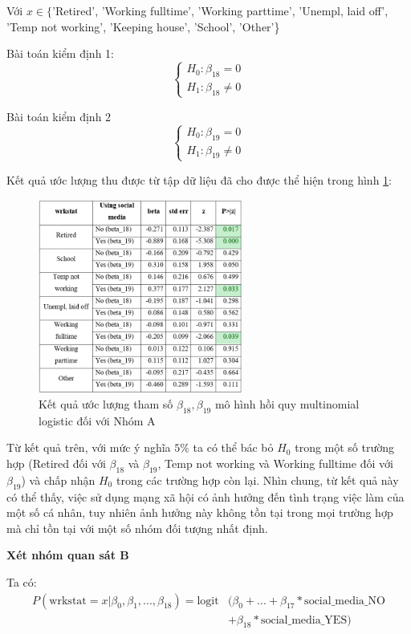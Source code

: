Với $x \in\{$'Retired', 'Working fulltime', 'Working parttime', 'Unempl, laid off', 'Temp not working', 'Keeping house', 'School', 'Other'\}

Bài toán kiểm định 1:
$$
\left\{\begin{array}{l}
H_{0}: \beta_{18}=0 \\
H_{1}: \beta_{18} \neq 0
\end{array}\right.
$$

Bài toán kiểm định 2
$$
\left\{\begin{array}{l}
H_{0}: \beta_{19}=0 \\
H_{1}: \beta_{19} \neq 0
\end{array}\right.
$$

Kết quả ước lượng thu được từ tập dữ liệu đã cho được thể hiện trong hình \ref{fig:beta1819}:

\begin{figure}[H]
    \centering
    \includegraphics[width=0.6\textwidth]{figures/beta1819.png}
    \caption{Kết quả ước lượng tham số $\beta_{18}, \beta_{19}$ mô hình hồi quy multinomial logistic đối với Nhóm A}
    \label{fig:beta1819}
\end{figure}

Từ kết quả trên, với mức ý nghĩa $5 \%$ ta có thể bác bỏ $H_{0}$ trong một số trường hợp (Retired đối với $\beta_{18}$ và $\beta_{19}$, Temp not working và Working fulltime đối với $\beta_{19}$) và chấp nhận $H_{0}$ trong các trường hợp còn lại. Nhìn chung, từ kết quả này có thể thấy, việc sử dụng mạng xã hội có ảnh hưởng đến tình trạng việc làm của một số cá nhân, tuy nhiên ảnh hưởng này không tồn tại trong mọi trường hợp mà chỉ tồn tại với một số nhóm đối tượng nhất định.


\textbf{Xét nhóm quan sát B}

Ta có:
\begin{equation*}
\begin{aligned}
P(\mathrm{wrkstat} = x \vert \beta_0, \beta_1,..., \beta_{18}) = \mathrm{logit}&(\beta_0 + ... + \beta_{17} * \text{social\_media\_NO} \\
   & + \beta_{18} * \text{social\_media\_YES})
\end{aligned}
\end{equation*}

